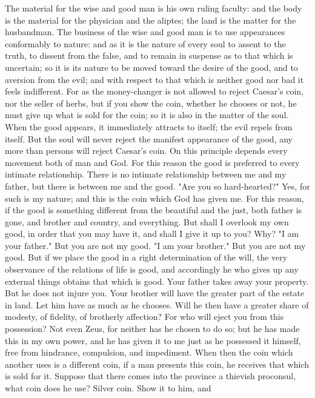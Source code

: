 \documentclass[a4paper]{article}
\begin{document}
    The material for the wise and good man is his own ruling faculty: and the
body is the material for the physician and the aliptes; the land is the matter
for the husbandman. The business of the wise and good man is to use appearances
conformably to nature: and as it is the nature of every soul to assent to the
truth, to dissent from the false, and to remain in suspense as to that which is
uncertain; so it is its nature to be moved toward the desire of the good, and
to aversion from the evil; and with respect to that which is neither good nor
bad it feels indifferent. For as the money-changer is not allowed to reject
Caesar's coin, nor the seller of herbs, but if you show the coin, whether he
chooses or not, he must give up what is sold for the coin; so it is also in the
matter of the soul. When the good appears, it immediately attracts to itself;
the evil repels from itself. But the soul will never reject the manifest
appearance of the good, any more than persons will reject Caesar's coin. On
this principle depends every movement both of man and God.
    For this reason the good is preferred to every intimate relationship. There
is no intimate relationship between me and my father, but there is between me
and the good. "Are you so hard-hearted?" Yes, for such is my nature; and this
is the coin which God has given me. For this reason, if the good is something
different from the beautiful and the just, both father is gone, and brother and
country, and everything. But shall I overlook my own good, in order that you
may have it, and shall I give it up to you? Why? "I am your father." But you
are not my good. "I am your brother." But you are not my good. But if we place
the good in a right determination of the will, the very observance of the
relations of life is good, and accordingly he who gives up any external things
obtains that which is good. Your father takes away your property. But he does
not injure you. Your brother will have the greater part of the estate in land.
Let him have as much as he chooses. Will he then have a greater share of
modesty, of fidelity, of brotherly affection? For who will eject you from this
possession? Not even Zeus, for neither has he chosen to do so; but he has made
this in my own power, and he has given it to me just as he possessed it
himself, free from hindrance, compulsion, and impediment. When then the coin
which another uses is a different coin, if a man presents this coin, he
receives that which is sold for it. Suppose that there comes into the province
a thievish proconsul, what coin does he use? Silver coin. Show it to him, and
\end{document}
